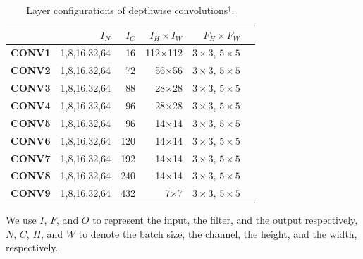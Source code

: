 \begin{table}[]
\caption{Layer configurations of depthwise  convolutions$^{\dag}$.}
\label{tab:depconvconfigs}
\centering
{}
\begin{threeparttable}
\begin{tabular}{lrrrrr}
\toprule
& \textbf{$I_N$} & \textbf{$I_C$} & \textbf{$I_H \times I_W$ }&  \textbf{$F_H \times F_W$} \\
\midrule
\textbf{CONV1} & 1,8,16,32,64  & 16    & 112$\times$112 & $3 \times 3$, $5 \times 5$  \\
\textbf{CONV2} & 1,8,16,32,64  & 72    & 56$\times$56  &$3 \times 3$, $5 \times 5$   \\
\textbf{CONV3} & 1,8,16,32,64  & 88   & 28$\times$28  &$3 \times 3$, $5 \times 5$    \\
\textbf{CONV4} & 1,8,16,32,64  & 96    & 28$\times$28  &$3 \times 3$, $5 \times 5$    \\
\textbf{CONV5} & 1,8,16,32,64  & 96   & 14$\times$14  &$3 \times 3$, $5 \times 5$    \\
\textbf{CONV6} & 1,8,16,32,64  & 120   & 14$\times$14  &$3 \times 3$, $5 \times 5$    \\
\textbf{CONV7} & 1,8,16,32,64  & 192   & 14$\times$14  &$3 \times 3$, $5 \times 5$    \\
\textbf{CONV8} & 1,8,16,32,64  & 240   & 14$\times$14  &$3 \times 3$, $5 \times 5$    \\
\textbf{CONV9} & 1,8,16,32,64  & 432   & 7$\times$7  &$3 \times 3$, $5 \times 5$    \\

\bottomrule
\end{tabular}
\footnotesize
\begin{tablenotes}
\item[\dag] We use $I$, $F$, and $O$ to represent the input, the filter, and the output respectively, $N$, $C$, $H$, and $W$
to denote the batch size, the channel, the height, and the width, respectively.
\end{tablenotes}
\end{threeparttable}
\vspace{-5mm}
\end{table}

